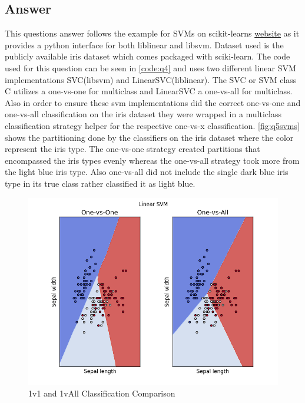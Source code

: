 \documentclass[11pt]{article}
\begin{document}
\subsection{Answer} 
This questions answer follows the example for SVMs on scikit-learns \href{http://scikit-learn.org/stable/auto_examples/svm/plot_iris.html}{website} as it provides a python interface for both liblinear and libsvm. Dataset used is the publicly available iris dataset which comes packaged with sciki-learn. The code used for this question can be seen in \autoref{code:q4} and uses two different linear SVM implementations SVC(libsvm) and LinearSVC(liblinear). The SVC or SVM class C utilizes a one-vs-one for multiclass and LinearSVC a one-vs-all for multiclass. Also in order to ensure these svm implementations did the correct one-vs-one and one-vs-all classification on the iris dataset they were wrapped in a multiclass classification strategy helper  for the respective one-vs-x classification. \newline \newline
\autoref{fig:q5svms} shows the partitioning done by the classifiers on the iris dataset where the color represent the iris type. The one-vs-one strategy created partitions that encompassed the iris types evenly whereas the one-vs-all strategy took more from the light blue iris type. Also one-vs-all did not include the single dark blue iris type in its true class rather classified it as light blue.
\begin{figure}[H]
\centering
\includegraphics[scale=.7]{svm_linear_1v1_1va.png}
\caption{1v1 and 1vAll Classification Comparison}
\label{fig:q5svms}
\end{figure}
\end{document}
